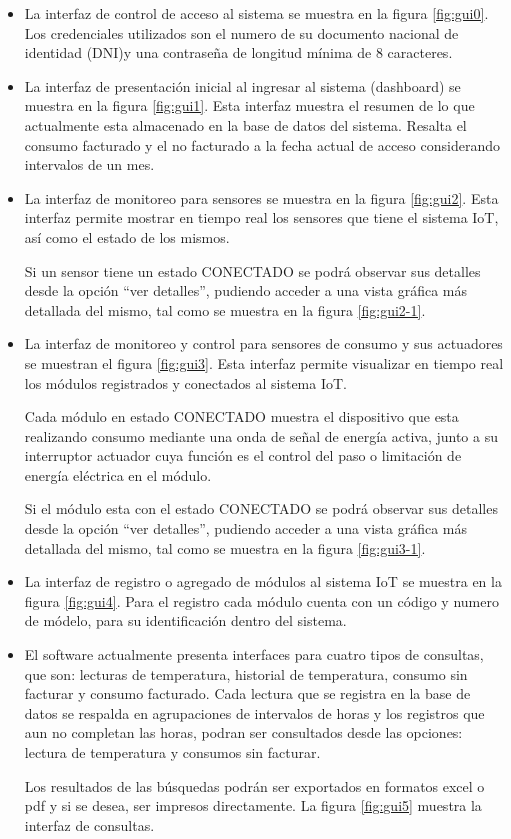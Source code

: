 \begin{itemize}
\item La interfaz de control de acceso al sistema se muestra en la figura \ref{fig:gui0}. Los credenciales utilizados son el numero de su documento nacional de identidad (DNI)y una contraseña de longitud mínima de 8 caracteres.

\item La interfaz de presentación inicial al ingresar al sistema (dashboard) se muestra en la figura \ref{fig:gui1}. Esta interfaz muestra el resumen de lo que actualmente esta almacenado en la base de datos del sistema. Resalta el consumo facturado y el no facturado a la fecha actual de acceso considerando intervalos de un mes.

\item La interfaz de monitoreo para sensores se muestra en la figura \ref{fig:gui2}. Esta interfaz permite mostrar en tiempo real los sensores que tiene el sistema IoT, así como el estado de los mismos. 

Si un sensor tiene un estado CONECTADO se podrá observar sus detalles desde la opción ``ver detalles'', pudiendo acceder a una vista gráfica más detallada del mismo, tal como se muestra en la figura \ref{fig:gui2-1}.

\item La interfaz de monitoreo y control para sensores de consumo y sus actuadores se muestran el figura \ref{fig:gui3}. Esta interfaz permite visualizar en tiempo real los módulos registrados y conectados al sistema IoT.

Cada módulo en estado CONECTADO muestra el dispositivo que esta realizando consumo mediante una onda de señal de energía activa, junto a su interruptor actuador cuya función es el control del paso o limitación de energía eléctrica en el módulo.

Si el módulo esta con el estado CONECTADO se podrá observar sus detalles desde la opción ``ver detalles'', pudiendo acceder a una vista gráfica más detallada del mismo, tal como se muestra en la figura \ref{fig:gui3-1}.

\item La interfaz de registro o agregado de módulos al sistema IoT se muestra en la figura \ref{fig:gui4}. Para el registro cada módulo cuenta con un código y numero de módelo, para su identificación dentro del sistema.

\item El software actualmente presenta interfaces para cuatro tipos de consultas, que son: lecturas de temperatura, historial de temperatura, consumo sin facturar y consumo facturado. Cada lectura que se registra en la base de datos se respalda en agrupaciones de intervalos de horas y los registros que aun no completan las horas, podran ser consultados desde las opciones: lectura de temperatura y consumos sin facturar.

Los resultados de las búsquedas podrán ser exportados en formatos excel o pdf y si se desea, ser impresos directamente. La figura \ref{fig:gui5} muestra la interfaz de consultas.

\end{itemize}






